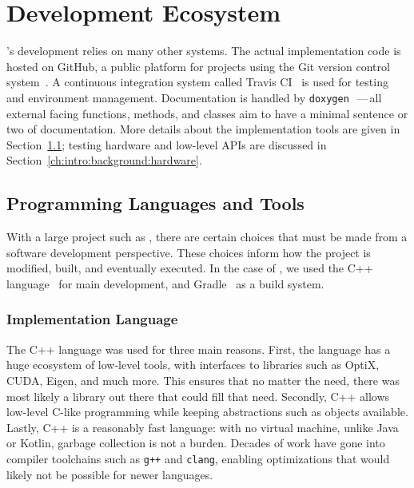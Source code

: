 \section{Development Ecosystem}
\label{ch:intro:background:development_ecosystem}

\name{}'s development relies on many other systems.
The actual implementation code is hosted on GitHub, a public platform for projects using the Git version control system~\cite{github, git}.
A continuous integration system called Travis CI~\cite{travisci} is used for testing and environment management.
Documentation is handled by \texttt{doxygen}~\cite{van2008doxygen}\,---\,all external facing functions, methods, and classes aim to have a minimal sentence or two of documentation.
More details about the implementation tools are given in Section~\ref{ch:intro:background:languages_and_libraries}; testing hardware and low-level APIs are discussed in Section~\ref{ch:intro:background:hardware}.

\subsection{Programming Languages and Tools}
\label{ch:intro:background:languages_and_libraries}

With a large project such as \name{}, there are certain choices that must be made from a software development perspective.
These choices inform how the project is modified, built, and eventually executed.
In the case of \name{}, we used the C++ language~\cite{cpp14standard} for main development, and Gradle~\cite{gradle} as a build system.

\subsubsection{Implementation Language}

The C++ language was used for three main reasons.
First, the language has a huge ecosystem of low-level tools, with interfaces to libraries such as OptiX, CUDA, Eigen, and much more.
This ensures that no matter the need, there was most likely a library out there that could fill that need.
Secondly, C++ allows low-level C-like programming while keeping abstractions such as objects available.
Lastly, C++ is a reasonably fast language: with no virtual machine, unlike Java or Kotlin, garbage collection is not a burden.
Decades of work have gone into compiler toolchains such as \texttt{g++} and \texttt{clang}, enabling optimizations that would likely not be possible for newer languages.

